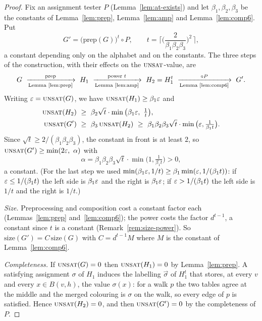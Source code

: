 \begin{proof}
Fix an assignment tester $P$ (Lemma~\ref{lem:at-exists}) and let $\beta_1,\beta_2,\beta_3$ be the constants of Lemma~\ref{lem:prep}, Lemma~\ref{lem:amp} and Lemma~\ref{lem:comp6}.  Put
\[
  G'=\big(\mathrm{prep}(G)\big)^{t}\circ P,\qquad
  t=\Big\lceil\Big(\frac{2}{\beta_1\beta_2\beta_3}\Big)^{2}\,\Big\rceil,
\]
a constant depending only on the alphabet and on the constants.  The three steps of the construction, with their effects on the $\textsc{unsat}$-value, are
\[
  G\ \xrightarrow[\text{Lemma~\ref{lem:prep}}]{\mathrm{prep}}\ H_1\ \xrightarrow[\text{Lemma~\ref{lem:amp}}]{\text{power }t}\ H_2=H_1^{t}\ \xrightarrow[\text{Lemma~\ref{lem:comp6}}]{\circ P}\ G'.
\]
Writing $\varepsilon=\textsc{unsat}(G)$, we have $\textsc{unsat}(H_1)\ge\beta_1\varepsilon$ and
\begin{align*}
  \textsc{unsat}(H_2)\ &\ge\ \beta_2\sqrt t\cdot\min\big(\beta_1\eps,\ \tfrac1t\big),\\
  \textsc{unsat}(G')\ &\ge\ \beta_3\,\textsc{unsat}(H_2)\ \ge\ \beta_1\beta_2\beta_3\sqrt t\cdot\min\big(\eps,\tfrac1{\beta_1 t}\big).
\end{align*}
Since $\sqrt t\ge 2/(\beta_1\beta_2\beta_3)$, the constant in front is at least $2$, so $\textsc{unsat}(G')\ge\min(2\eps,\ \alpha)$ with
\[
  \alpha=\beta_1\beta_2\beta_3\sqrt t\cdot\min\big(1,\tfrac1{\beta_1 t}\big)>0,
\]
a constant.
(For the last step we used $\min(\beta_1\varepsilon,1/t)\ge\beta_1\min(\varepsilon,1/(\beta_1 t))$: if $\varepsilon\le1/(\beta_1t)$ the left side is $\beta_1\varepsilon$ and the right is $\beta_1\varepsilon$; if $\varepsilon>1/(\beta_1t)$ the left side is $1/t$ and the right is $1/t$.)

\emph{Size.}  Preprocessing and composition cost a constant factor each (Lemmas~\ref{lem:prep} and~\ref{lem:comp6}); the power costs the factor $d^{t-1}$, a constant since $t$ is a constant (Remark~\ref{rem:size-power}).
So $\mathrm{size}(G')=C\,\mathrm{size}(G)$ with $C=d^{t-1}M$ where $M$ is the constant of Lemma~\ref{lem:comp6}.

\emph{Completeness.}  If $\textsc{unsat}(G)=0$ then $\textsc{unsat}(H_1)=0$ by Lemma~\ref{lem:prep}.  A satisfying assignment $\sigma$ of $H_1$ induces the labelling $\vec\sigma$ of $H_1^{t}$ that stores, at every $v$ and every $x\in B(v,h)$, the value $\sigma(x)$: for a walk $p$ the two tables agree at the middle and the merged colouring is $\sigma$ on the walk, so every edge of $p$ is satisfied.  Hence $\textsc{unsat}(H_2)=0$, and then $\textsc{unsat}(G')=0$ by the completeness of $P$.
\end{proof}

